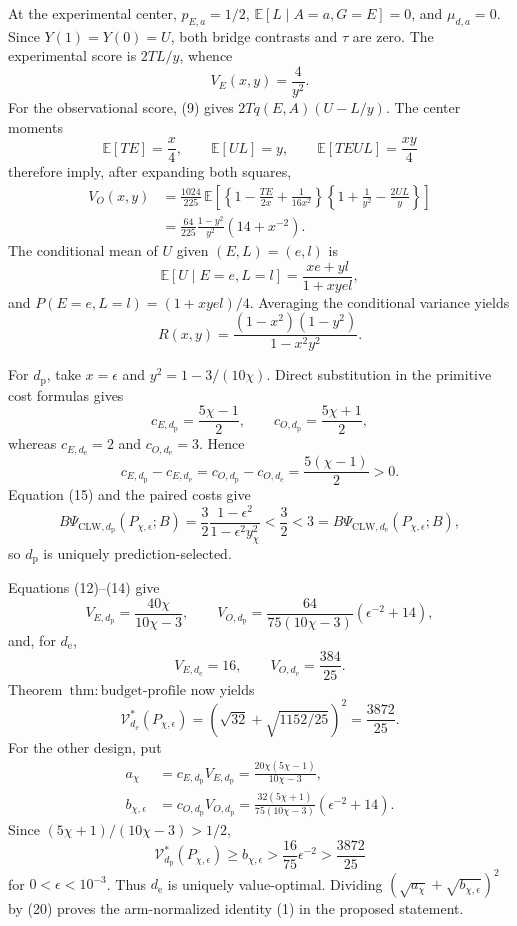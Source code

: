 At the experimental center, \(p_{E,a}=1/2\), \(\mathbb E[L\mid A=a,G=E]=0\), and \(\mu_{d,a}=0\). Since \(Y(1)=Y(0)=U\), both bridge contrasts and \(\tau\) are zero. The experimental score is \(2TL/y\), whence
\[
 V_E(x,y)=\frac4{y^2}.                                  \tag{12}
\]
For the observational score, (9) gives \(2Tq(E,A)(U-L/y)\). The center moments
\[
 \mathbb E[TE]=\frac{x}{4},\qquad
 \mathbb E[UL]=y,
 \qquad
 \mathbb E[TEUL]=\frac{xy}{4}                           \tag{13}
\]
therefore imply, after expanding both squares,
\[
\begin{aligned}
 V_O(x,y)
 &=\frac{1024}{225}\,
 \mathbb E\!\left[
 \left\{1-\frac{TE}{2x}+\frac1{16x^2}\right\}
 \left\{1+\frac1{y^2}-\frac{2UL}{y}\right\}
 \right]\\
 &=\frac{64}{225}\frac{1-y^2}{y^2}\left(14+x^{-2}\right). \tag{14}
\end{aligned}
\]
The conditional mean of \(U\) given \((E,L)=(e,l)\) is
\[
 \mathbb E[U\mid E=e,L=l]=\frac{xe+yl}{1+xyel},
\]
and \(P(E=e,L=l)=(1+xyel)/4\). Averaging the conditional variance yields
\[
 R(x,y)=\frac{(1-x^2)(1-y^2)}{1-x^2y^2}.               \tag{15}
\]

For \(d_{\mathrm p}\), take \(x=\epsilon\) and \(y^2=1-3/(10\chi)\). Direct substitution in the primitive cost formulas gives
\[
 c_{E,d_{\mathrm p}}=\frac{5\chi-1}{2},\qquad
 c_{O,d_{\mathrm p}}=\frac{5\chi+1}{2},
\]
whereas \(c_{E,d_{\mathrm e}}=2\) and \(c_{O,d_{\mathrm e}}=3\). Hence
\[
 c_{E,d_{\mathrm p}}-c_{E,d_{\mathrm e}}
 =c_{O,d_{\mathrm p}}-c_{O,d_{\mathrm e}}
 =\frac{5(\chi-1)}2>0.                                 \tag{16}
\]
Equation (15) and the paired costs give
\[
 B\Psi_{\mathrm{CLW},d_{\mathrm p}}(P_{\chi,\epsilon};B)
 =\frac32\frac{1-\epsilon^2}{1-\epsilon^2y_\chi^2}
 <\frac32<3
 =B\Psi_{\mathrm{CLW},d_{\mathrm e}}(P_{\chi,\epsilon};B), \tag{17}
\]
so \(d_{\mathrm p}\) is uniquely prediction-selected.

Equations (12)--(14) give
\[
 V_{E,d_{\mathrm p}}=\frac{40\chi}{10\chi-3},
 \qquad
 V_{O,d_{\mathrm p}}
 =\frac{64}{75(10\chi-3)}(\epsilon^{-2}+14),           \tag{18}
\]
and, for \(d_{\mathrm e}\),
\[
 V_{E,d_{\mathrm e}}=16,\qquad
 V_{O,d_{\mathrm e}}=\frac{384}{25}.                   \tag{19}
\]
Theorem~\(\mathrm{thm{:}budget\text{-}profile}\) now yields
\[
 \mathcal V_{d_{\mathrm e}}^*(P_{\chi,\epsilon})
 =\left(\sqrt{32}+\sqrt{1152/25}\right)^2
 =\frac{3872}{25}.                                     \tag{20}
\]
For the other design, put
\[
\begin{aligned}
 a_\chi
 &=c_{E,d_{\mathrm p}}V_{E,d_{\mathrm p}}
 =\frac{20\chi(5\chi-1)}{10\chi-3},\\
 b_{\chi,\epsilon}
 &=c_{O,d_{\mathrm p}}V_{O,d_{\mathrm p}}
 =\frac{32(5\chi+1)}{75(10\chi-3)}
   (\epsilon^{-2}+14).                                  \tag{21}
\end{aligned}
\]
Since \((5\chi+1)/(10\chi-3)>1/2\),
\[
 \mathcal V_{d_{\mathrm p}}^*(P_{\chi,\epsilon})
 \ge b_{\chi,\epsilon}
 >\frac{16}{75}\epsilon^{-2}
 >\frac{3872}{25}                                      \tag{22}
\]
for \(0<\epsilon<10^{-3}\). Thus \(d_{\mathrm e}\) is uniquely value-optimal. Dividing \((\sqrt{a_\chi}+\sqrt{b_{\chi,\epsilon}})^2\) by (20) proves the arm-normalized identity (1) in the proposed statement.

